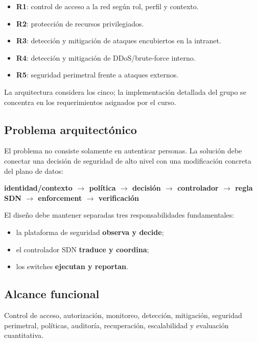 \documentclass[11pt,a4paper]{article}
\begin{document}
\begin{itemize}
\item \textbf{R1}: control de acceso a la red según rol, perfil y contexto.
\item \textbf{R2}: protección de recursos privilegiados.
\item \textbf{R3}: detección y mitigación de ataques encubiertos en la intranet.
\item \textbf{R4}: detección y mitigación de DDoS/brute-force interno.
\item \textbf{R5}: seguridad perimetral frente a ataques externos.
\end{itemize}

La arquitectura considera los cinco; la implementación detallada del grupo se concentra en los requerimientos asignados por el curso.

\subsection{Problema arquitectónico}

El problema no consiste solamente en autenticar personas. La solución debe conectar una decisión de seguridad de alto nivel con una modificación concreta del plano de datos:

\begin{center}
\textbf{identidad/contexto \(\rightarrow\) política \(\rightarrow\) decisión \(\rightarrow\) controlador \(\rightarrow\) regla SDN \(\rightarrow\) enforcement \(\rightarrow\) verificación}
\end{center}

El diseño debe mantener separadas tres responsabilidades fundamentales:

\begin{itemize}
\item la plataforma de seguridad \textbf{observa y decide};
\item el controlador SDN \textbf{traduce y coordina};
\item los switches \textbf{ejecutan y reportan}.
\end{itemize}

\subsection{Alcance funcional}

Control de acceso, autorización, monitoreo, detección, mitigación, seguridad perimetral, políticas, auditoría, recuperación, escalabilidad y evaluación cuantitativa.
\end{document}
